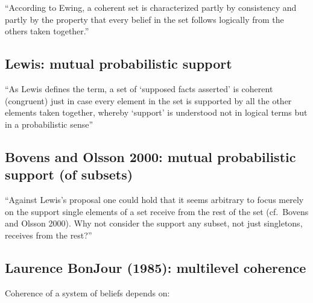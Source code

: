 \documentclass[
  11pt,
  dvipsnames,enabledeprecatedfontcommands]{scrartcl}
\begin{document}
``According to Ewing, a coherent set is characterized partly by
consistency and partly by the property that every belief in the set
follows logically from the others taken together.''

\hypertarget{lewis-mutual-probabilistic-support}{%
\subsection{Lewis: mutual probabilistic
support}\label{lewis-mutual-probabilistic-support}}

``As Lewis defines the term, a set of `supposed facts asserted' is
coherent (congruent) just in case every element in the set is supported
by all the other elements taken together, whereby `support' is
understood not in logical terms but in a probabilistic sense''

\hypertarget{bovens-and-olsson-2000-mutual-probabilistic-support-of-subsets}{%
\subsection{Bovens and Olsson 2000: mutual probabilistic support (of
subsets)}\label{bovens-and-olsson-2000-mutual-probabilistic-support-of-subsets}}

``Against Lewis's proposal one could hold that it seems arbitrary to
focus merely on the support single elements of a set receive from the
rest of the set (cf.~Bovens and Olsson 2000). Why not consider the
support any subset, not just singletons, receives from the rest?''

\hypertarget{laurence-bonjour-1985-multilevel-coherence}{%
\subsection{Laurence BonJour (1985): multilevel
coherence}\label{laurence-bonjour-1985-multilevel-coherence}}

Coherence of a system of beliefs depends on:
\end{document}
